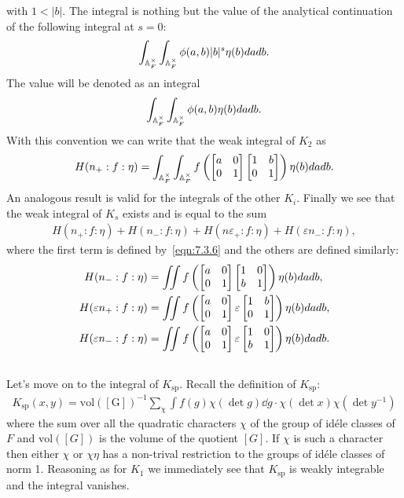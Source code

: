with $1 < |b|$.
The integral is nothing but the value of the analytical continuation of the following integral at $s=0$:
\begin{align}
    \int_{\mathbb{A}_F^\times} \int_{\mathbb{A}_F^\times} \phi(a, b) |b|^s \eta(b) dadb.
\end{align}
The value will be denoted as an integral
\begin{align}
    \int_{\mathbb{A}_F^\times} \int_{\mathbb{A}_F^\times} \phi(a, b) \eta(b) dadb.
\end{align}
With this convention we can write that the weak integral of $K_2$ as
\begin{align}
    \label{eqn:7.3.6}
    H(n_+: f:\eta) = \int_{\mathbb{A}_F^\times}\int_{\mathbb{A}_F^\times} f\left(\begin{bmatrix} a & 0 \\ 0 & 1 \end{bmatrix} \begin{bmatrix} 1 & b \\ 0 & 1 \end{bmatrix} \right) \eta(b) dadb.
\end{align}
An analogous result is valid for the integrals of the other $K_i$.
Finally we see that the weak integral of $K_s$ exists and is equal to the sum
\begin{align}
    H(n_+:f:\eta) + H(n_-:f:\eta) + H(n\varepsilon_+ :f:\eta) + H(\varepsilon n_-:f:\eta),
\end{align}
where the first term is defined by~\eqref{eqn:7.3.6} and the others are defined similarly:
\begin{align}
    H(n_-:f:\eta) &= \iint f\left(\begin{bmatrix} a & 0 \\ 0 & 1 \end{bmatrix} \begin{bmatrix} 1 & 0 \\ b & 1 \end{bmatrix} \right) \eta(b) da db, \\
    H(\varepsilon n_+:f:\eta) &= \iint f\left(\begin{bmatrix} a & 0 \\ 0 & 1 \end{bmatrix} \varepsilon \begin{bmatrix} 1 & b \\ 0 & 1 \end{bmatrix} \right) \eta(b) da db, \\
    H(\varepsilon n_-:f:\eta) &= \iint f\left(\begin{bmatrix} a & 0 \\ 0 & 1 \end{bmatrix} \varepsilon \begin{bmatrix} 1 & 0 \\ b & 1 \end{bmatrix} \right) \eta(b) da db.
\end{align}

\subsection{}
Let's move on to the integral of $K_{\mathrm{sp}}$.
Recall the definition of $K_{\mathrm{sp}}$:
\begin{align*}
    K_{\mathrm{sp}}(x, y) = \mathrm{vol([G])}^{-1} \sum_{\chi} \int f(g) \chi(\det g) \dd g \cdot \chi(\det x)\chi(\det y^{-1})
\end{align*}
where the sum over all the quadratic characters $\chi$ of the group of id\'ele classes of $F$ and $\mathrm{vol}([G])$ is the volume of the quotient $[G]$.
If $\chi$ is such a character then either $\chi$ or $\chi\eta$ has a non-trival restriction to the groups of id\'ele classes of norm 1.
Reasoning as for $K_1$ we immediately see that $K_\mathrm{sp}$ is weakly integrable and the integral vanishes.


